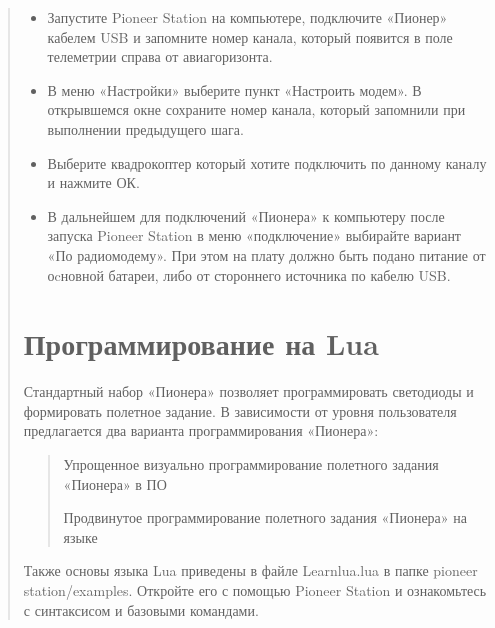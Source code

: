 \documentclass[a4paper,10pt,russian]{sphinxmanual}
\let\sphinxpxdimen\pdfpxdimen\else\newdimen\sphinxpxdimen
\begin{document}
\begin{quote}
\begin{itemize}
\item {} 
Запустите Pioneer Station на компьютере, подключите «Пионер» кабелем USB и запомните номер канала, который появится в поле телеметрии справа от авиагоризонта.

\item {} 
В меню «Настройки» выберите пункт «Настроить модем». В открывшемся окне сохраните номер канала, который запомнили при выполнении предыдущего шага.

\item {} 
Выберите квадрокоптер который хотите подключить по данному каналу и нажмите ОК.

\item {} 
В дальнейшем для подключений «Пионера» к компьютеру после запуска Pioneer Station в меню «подключение» выбирайте вариант «По радиомодему». При этом на плату должно быть подано питание от оcновной батареи, либо от стороннего источника по кабелю USB.

\end{itemize}


\section{Программирование на Lua}
\label{\detokenize{programming/lua/lua_main:lua}}\label{\detokenize{programming/lua/lua_main::doc}}
\noindent{\hspace*{\fill}\sphinxincludegraphics[width=200\sphinxpxdimen]{{programming}.png}\hspace*{\fill}}

Стандартный набор «Пионера» позволяет программировать светодиоды и формировать полетное задание. В зависимости от уровня пользователя предлагается два варианта программирования «Пионера»:
\begin{quote}

Упрощенное визуально программирование полетного задания «Пионера» в ПО 

Продвинутое программирование полетного задания «Пионера» на языке 
\end{quote}

Также основы языка Lua приведены в файле Learnlua.lua в папке pioneer station/examples. Откройте его с помощью Pioneer Station и ознакомьтесь с синтаксисом и базовыми командами.


\end{quote}
\end{document}
